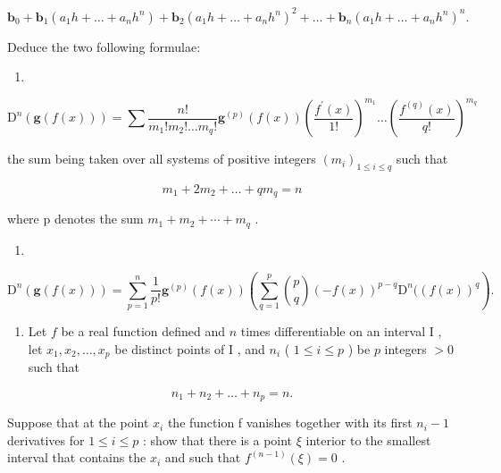 \[
\mathbf {b} _ {0} + \mathbf {b} _ {1} (a _ {1} h + \dots + a _ {n} h ^ {n}) + \mathbf {b} _ {2} (a _ {1} h + \dots + a _ {n} h ^ {n}) ^ {2} + \dots + \mathbf {b} _ {n} (a _ {1} h + \dots + a _ {n} h ^ {n}) ^ {n}.
\]

Deduce the two following formulae:

\begin{enumerate}
\def\labelenumi{\alph{enumi})}
\tightlist
\item
\end{enumerate}

\[
\mathrm{D} ^ {n} (\mathbf {g} (f (x))) = \sum \frac {n !}{m _ {1} ! m _ {2} ! \dots m _ {q} !} \mathbf {g} ^ {(p)} (f (x)) \left(\frac {f ^ {\prime} (x)}{1 !}\right) ^ {m _ {1}} \dots \left(\frac {f ^ {(q)} (x)}{q !}\right) ^ {m _ {q}}
\]

the sum being taken over all systems of positive integers \((m_{i})_{1\leqslant i\leqslant q}\) such that

\[
m _ {1} + 2 m _ {2} + \dots + q m _ {q} = n
\]

where p denotes the sum \(m_{1} + m_{2} + \cdots + m_{q}\) .

\begin{enumerate}
\def\labelenumi{\alph{enumi})}
\setcounter{enumi}{1}
\tightlist
\item
\end{enumerate}

\[
\mathrm{D} ^ {n} (\mathbf {g} (f (x))) = \sum_ {p = 1} ^ {n} \frac {1}{p !}   \mathbf {g} ^ {(p)} (f (x)) \left(\sum_ {q = 1} ^ {p} \binom {p} {q} (- f (x)) ^ {p - q}   \mathrm{D} ^ {n} ((f (x)) ^ {q}\right).
\]

\begin{enumerate}
\def\labelenumi{\arabic{enumi})}
\setcounter{enumi}{7}
\tightlist
\item
  Let \(f\) be a real function defined and \(n\) times differentiable on an interval \(\mathrm{I}\) , let \(x_{1}, x_{2}, \ldots, x_{p}\) be distinct points of \(\mathrm{I}\) , and \(n_{i}\) ( \(1 \leqslant i \leqslant p\) ) be \(p\) integers \(> 0\) such that
\end{enumerate}

\[
n _ {1} + n _ {2} + \dots + n _ {p} = n.
\]

Suppose that at the point \(x_{i}\) the function f vanishes together with its first \(n_{i}-1\) derivatives for \(1 \leqslant i \leqslant p\) : show that there is a point \(\xi\) interior to the smallest interval that contains the \(x_{i}\) and such that \(f^{(n-1)}(\xi) = 0\) .

